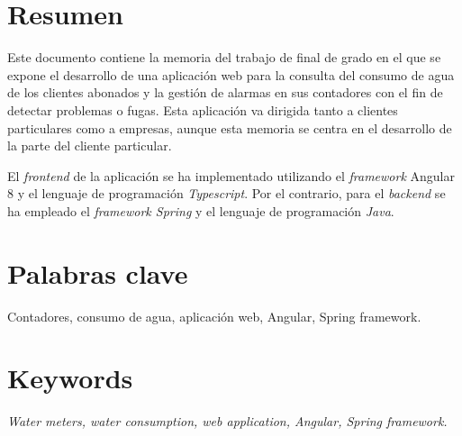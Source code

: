 \documentclass[pdftex,11pt,a4paper]{book}
\begin{document}

\thispagestyle{empty} %

\clearpage %

\section*{Resumen}

Este documento contiene la memoria del trabajo de final de grado en el que se expone el desarrollo de una aplicación web para la consulta del consumo de agua de los clientes abonados y la gestión de alarmas en sus contadores con el fin de detectar problemas o fugas. Esta aplicación va dirigida tanto a clientes particulares como a empresas, aunque esta memoria se centra en el desarrollo de la parte del cliente particular.

El \textit{frontend} de la aplicación se ha implementado utilizando el \textit{framework} Angular 8 y el lenguaje de programación \textit{Typescript}. Por el contrario, para el \textit{backend} se ha empleado el \textit{framework Spring} y el lenguaje de programación \textit{Java}.


\section*{Palabras clave}

Contadores, consumo de agua, aplicación web, Angular, Spring framework.

\section*{Keywords}

\textit{Water meters, water consumption, web application, Angular, Spring framework.}

\thispagestyle{empty} %

\cleardoublepage




\pagestyle{plain} %

\tableofcontents
{}


\cleardoublepage
\listoffigures
\listoftables
\end{document}

